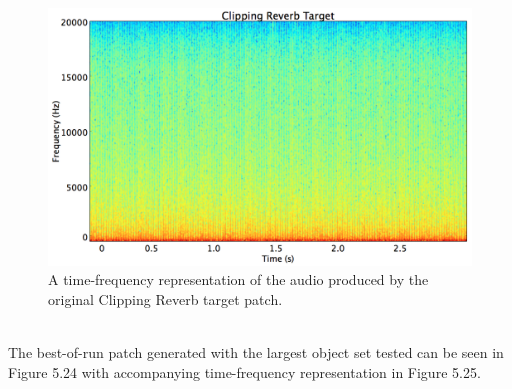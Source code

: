 \documentclass[12pt]{report} 	%
\numberwithin{figure}{chapter}
\numberwithin{table}{chapter}
\numberwithin{equation}{chapter}
\begin{document}
\begin{flushleft}
\begin{figure}[h!]
\begin{center}
\includegraphics[scale=0.35,width=\linewidth]{ClippingReverbTargetSTFT}
\caption[Original clipping reverb sawtooth time-frequency representation]{A time-frequency representation of the audio produced by the original Clipping Reverb target patch.}
\end{center}
\end{figure}
\\

The best-of-run patch generated with the largest object set tested can be seen in Figure 5.24 with accompanying time-frequency representation in Figure 5.25.


\end{flushleft}
\end{document}
